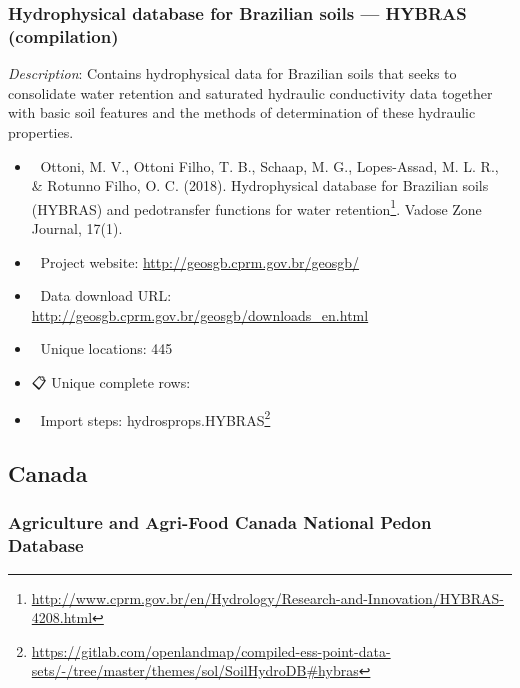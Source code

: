 \documentclass[
  graybox,natbib,nospthms]{svmono}
\providecommand{\tightlist}{%
  \setlength{\itemsep}{0pt}\setlength{\parskip}{0pt}}
\providecommand{\tightlist}{\setlength{\itemsep}{0pt}\setlength{\parskip}{0pt}}
\renewcommand{\href}[2]{#2 (\url{#1})}
\renewcommand{\href}[2]{#2\footnote{\url{#1}}}
\begin{document}
\hypertarget{hydrophysical-database-for-brazilian-soils-hybras-compilation}{%
\subsubsection{Hydrophysical database for Brazilian soils --- HYBRAS (compilation)}\label{hydrophysical-database-for-brazilian-soils-hybras-compilation}}

\emph{Description}: Contains hydrophysical data for Brazilian soils that seeks to consolidate water retention and saturated hydraulic conductivity data together with basic soil features and the methods of determination of these hydraulic properties.

\begin{itemize}
\tightlist
\item
  📕 Ottoni, M. V., Ottoni Filho, T. B., Schaap, M. G., Lopes-Assad, M. L. R., \& Rotunno Filho, O. C. (2018). \href{http://www.cprm.gov.br/en/Hydrology/Research-and-Innovation/HYBRAS-4208.html}{Hydrophysical database for Brazilian soils (HYBRAS) and pedotransfer functions for water retention}. Vadose Zone Journal, 17(1).
\item
  🔗 Project website: \url{http://geosgb.cprm.gov.br/geosgb/}\\
\item
  📂 Data download URL: \url{http://geosgb.cprm.gov.br/geosgb/downloads_en.html}\\
\item
  📍 Unique locations: 445\\
\item
  📋 Unique complete rows:\\
\item
  📝 Import steps: \href{https://gitlab.com/openlandmap/compiled-ess-point-data-sets/-/tree/master/themes/sol/SoilHydroDB\#hybras}{hydrosprops.HYBRAS}
\end{itemize}

\hypertarget{canada}{%
\subsection{Canada}\label{canada}}

\hypertarget{agriculture-and-agri-food-canada-national-pedon-database}{%
\subsubsection{Agriculture and Agri-Food Canada National Pedon Database}\label{agriculture-and-agri-food-canada-national-pedon-database}}
\end{document}

